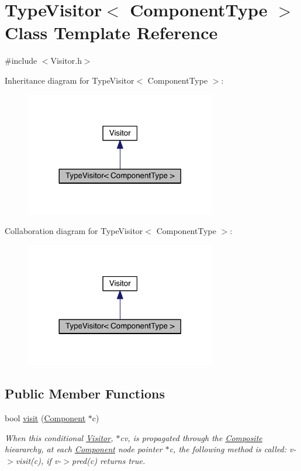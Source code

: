 \hypertarget{classTypeVisitor}{\section{Type\+Visitor$<$ Component\+Type $>$ Class Template Reference}
\label{classTypeVisitor}
}


{\ttfamily \#include $<$Visitor.\+h$>$}



Inheritance diagram for Type\+Visitor$<$ Component\+Type $>$\+:\nopagebreak
\begin{figure}[H]
\begin{center}
\leavevmode
\includegraphics[width=236pt]{classTypeVisitor__inherit__graph}
\end{center}
\end{figure}


Collaboration diagram for Type\+Visitor$<$ Component\+Type $>$\+:\nopagebreak
\begin{figure}[H]
\begin{center}
\leavevmode
\includegraphics[width=236pt]{classTypeVisitor__coll__graph}
\end{center}
\end{figure}
\subsection*{Public Member Functions}
\begin{DoxyCompactItemize}
\item 
bool \hyperlink{classVisitor_a3f8ea7ad6aa61e99d8d1bc0576bdf23c}{visit} (\hyperlink{classComponent}{Component} $\ast$c)
\begin{DoxyCompactList}\small\item\em When this conditional \hyperlink{classVisitor}{Visitor}, $\ast$cv, is propagated through the \hyperlink{classComposite}{Composite} hieararchy, at each \hyperlink{classComponent}{Component} node pointer $\ast$c, the following method is called\+: v-\/$>$visit(c), if v-\/$>$pred(c) returns true. \end{DoxyCompactList}\end{DoxyCompactItemize}
